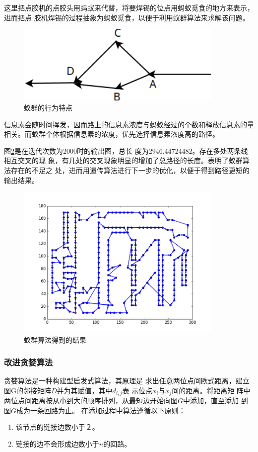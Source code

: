 \documentclass[fontset=windows,a4paper,12pt]{ctexart}
\begin{document}
		   这里把点胶机的点胶头用蚂蚁来代替，将要焊锡的位点用蚂蚁觅食的地方来表示，进而把点
		   胶机焊锡的过程抽象为蚂蚁觅食，以便于利用蚁群算法来求解该问题。
    	   \begin{figure}[htbp]
    	   	\centering
    	   	\includegraphics[width=10cm]{pic/anti1.png}
    	   	\caption{蚁群的行为特点}
    	   	\label{fig:anti1}
    	   \end{figure}		   

			信息素会随时间挥发，因而路上的信息素浓度与蚂蚁经过的个数和释放信息素的量
			相关。而蚁群个体根据信息素的浓度，优先选择信息素浓度高的路径。
			
		   图\ref{fig:anti}是在迭代次数为2000时的输出图，总长
		   度为$2946.44724482$。存在多处两条线相互交叉的现
		   象，有几处的交叉现象明显的增加了总路径的长度。表明了蚁群算法存在的不足之
		   处，进而用遗传算法进行下一步的优化，以便于得到路径更短的输出结果。			
    	   \begin{figure}[htbp]
    	   	 \centering
    	   	 \includegraphics[width=10cm]{pic/anti_result.png}
    	   	 \caption{蚁群算法得到的结果}
    	   	 \label{fig:anti}
    	   \end{figure}


      \subsubsection{改进贪婪算法\cite{饶卫振2012基于求解}}
        贪婪算法是一种构建型启发式算法，其原理是
        求出任意两位点间欧式距离，建立图G的邻接矩阵$D$并为其赋值，其中$d_{i,j}$表
        示位点$x_i$与$x_j$间的距离。将距离矩
        阵中两位点间距离按从小到大的顺序排列，从最短边开始向图$G$中添加，直至添加
        到图$G$成为一条回路为止。
        在添加过程中算法遵循以下原则：
        \begin{enumerate}
        	\item 该节点的链接边数小于２。
        	\item 链接的边不会形成边数小于$n$的回路。
        \end{enumerate}
        
\end{document}
